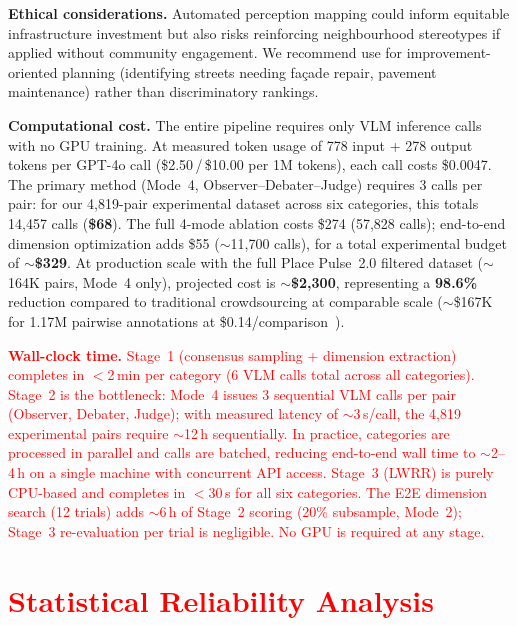 \documentclass[runningheads]{llncs}
\begin{document}
\smallskip\noindent\textbf{Ethical considerations.}
Automated perception mapping could inform equitable infrastructure investment but also risks reinforcing neighbourhood stereotypes if applied without community engagement.
We recommend use for improvement-oriented planning (identifying streets needing fa\c{c}ade repair, pavement maintenance) rather than discriminatory rankings.

\smallskip\noindent\textbf{Computational cost.}
The entire pipeline requires only VLM inference calls with no GPU training.
At measured token usage of 778 input + 278 output tokens per GPT-4o call (\$2.50\,/\,\$10.00 per 1M tokens), each call costs \$0.0047.
The primary method (Mode~4, Observer--Debater--Judge) requires 3 calls per pair: for our 4,819-pair experimental dataset across six categories, this totals 14,457 calls (\textbf{\$68}).
The full 4-mode ablation costs \$274 (57,828 calls); end-to-end dimension optimization adds \$55 (${\sim}$11,700 calls), for a total experimental budget of \textbf{${\sim}$\$329}.
At production scale with the full Place Pulse~2.0 filtered dataset (${\sim}$164K pairs, Mode~4 only), projected cost is ${\sim}$\textbf{\$2,300}, representing a \textbf{98.6\%} reduction compared to traditional crowd\-sourcing at comparable scale (${\sim}$\$167K for 1.17M pairwise annotations at \$0.14/comparison~\cite{salesses2013collaborative}).

\textcolor{red}{\smallskip\noindent\textbf{Wall-clock time.}
Stage~1 (consensus sampling + dimension extraction) completes in $<$2\,min per category (6 VLM calls total across all categories).
Stage~2 is the bottleneck: Mode~4 issues 3 sequential VLM calls per pair (Observer, Debater, Judge); with measured latency of ${\sim}$3\,s/call, the 4,819 experimental pairs require ${\sim}$12\,h sequentially.
In practice, categories are processed in parallel and calls are batched, reducing end-to-end wall time to ${\sim}$2--4\,h on a single machine with concurrent API access.
Stage~3 (LWRR) is purely CPU-based and completes in $<$30\,s for all six categories.
The E2E dimension search (12 trials) adds ${\sim}$6\,h of Stage~2 scoring (20\% subsample, Mode~2); Stage~3 re-evaluation per trial is negligible.
No GPU is required at any stage.}


\section{\textcolor{red}{Statistical Reliability Analysis}}
\label{sec:reliability}
\end{document}
